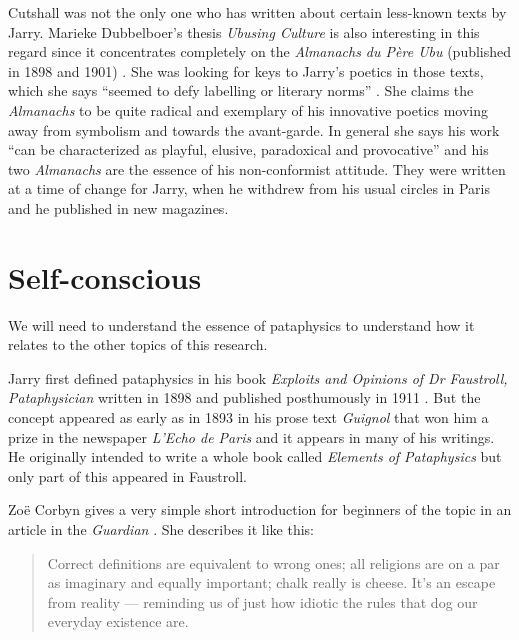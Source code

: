 
Cutshall was not the only one who has written about certain less-known texts by Jarry. Marieke Dubbelboer's thesis \textit{Ubusing Culture} is also interesting in this regard since it concentrates completely on the \textit{Almanachs du Père Ubu} (published in 1898 and 1901) \autocite*{Dubbelboer2009}. She was looking for keys to Jarry's poetics in those texts, which she says ``seemed to defy labelling or literary norms'' \autocite*{Dubbelboer2009}. She claims the \textit{Almanachs} to be quite radical and exemplary of his innovative poetics moving away from symbolism and towards the avant-garde. In general she says his work ``can be characterized as playful, elusive, paradoxical and provocative'' \autocite*{Dubbelboer2009} and his two \textit{Almanachs} are the essence of his non-conformist attitude. They were written at a time of change for Jarry, when he withdrew from his usual circles in Paris and he published in new magazines.


\section{Self-conscious}

We will need to understand the essence of pataphysics to understand how it relates to the other topics of this research.

Jarry first defined pataphysics in his book \textit{Exploits and Opinions of Dr Faustroll, Pataphysician} written in 1898 and published posthumously in 1911 \autocite*{Jarry1996}. But the concept appeared as early as in 1893 in his prose text \textit{Guignol} that won him a prize in the newspaper \textit{L'Echo de Paris} and it appears in many of his writings. He originally intended to write a whole book called \textit{Elements of Pataphysics} but only part of this appeared in Faustroll.

Zo{\"e} Corbyn gives a very simple short introduction for beginners of the topic in an article in the \textit{Guardian} \autocite*{Corbyn2005}. She describes it like this:

\begin{quotation}
  Correct definitions are equivalent to wrong ones; all religions are on a par as imaginary and equally important; chalk really is cheese. It's an escape from reality --- reminding us of just how idiotic the rules that dog our everyday existence are. 
\end{quotation}

